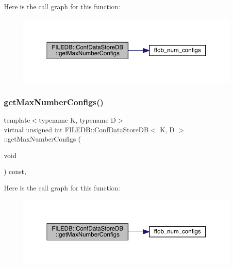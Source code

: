 Here is the call graph for this function\+:
\nopagebreak
\begin{figure}[H]
\begin{center}
\leavevmode
\includegraphics[width=347pt]{d8/d19/classFILEDB_1_1ConfDataStoreDB_a89337b5034d8f87b4a37ceb05ea99d3a_cgraph}
\end{center}
\end{figure}
\mbox{\label{classFILEDB_1_1ConfDataStoreDB_a89337b5034d8f87b4a37ceb05ea99d3a}} 
\subsubsection{\texorpdfstring{getMaxNumberConfigs()}{getMaxNumberConfigs()}\hspace{0.1cm}{\footnotesize\ttfamily [2/3]}}
{\footnotesize\ttfamily template$<$typename K, typename D$>$ \\
virtual unsigned int \mbox{\hyperlink{classFILEDB_1_1ConfDataStoreDB}{F\+I\+L\+E\+D\+B\+::\+Conf\+Data\+Store\+DB}}$<$ K, D $>$\+::get\+Max\+Number\+Configs (\begin{DoxyParamCaption}\item[{void}]{ }\end{DoxyParamCaption}) const\hspace{0.3cm}{\ttfamily [inline]}, {\ttfamily [virtual]}}

Here is the call graph for this function\+:
\nopagebreak
\begin{figure}[H]
\begin{center}
\leavevmode
\includegraphics[width=347pt]{d8/d19/classFILEDB_1_1ConfDataStoreDB_a89337b5034d8f87b4a37ceb05ea99d3a_cgraph}
\end{center}
\end{figure}
\mbox{\label{classFILEDB_1_1ConfDataStoreDB_a89337b5034d8f87b4a37ceb05ea99d3a}} 
